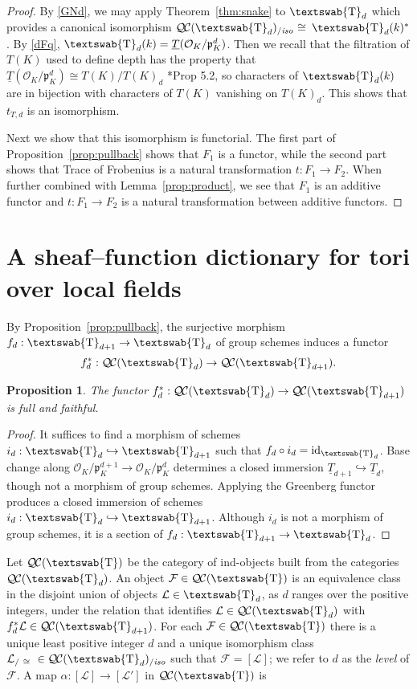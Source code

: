 \documentclass[11pt]{amsart}
\newcommand{\mathswab}[1]{\operatorname{\textswab{#1}}}
\theoremstyle{plain}
\newtheorem{proposition}[theorem]{Proposition}
\theoremstyle{definition}
\theoremstyle{remark}
\newcommand{\OK}{\mathcal{O}_K}
\newcommand{\pK}{\mathfrak{p}_K}
\newcommand{\Fq}{k}
\DeclareMathOperator{\id}{id}
\newcommand{\iso}{{\ \cong\ }}
\newcommand{\GN}[1]{\mathswab{#1}}
\newcommand{\TT}{\underline{T}}
\newcommand{\qcs}[1]{{\mathcal{#1}}}
\newcommand{\QC}{{\mathcal{Q\hskip-0.8pt C}}}
\newcommand{\QCiso}[1]{\QC(#1)_{/\textit{iso}}}
\newcommand{\trFrob}[1]{t_{#1}}
\begin{document}
\begin{proof}
  By \ref{GNd}, we may apply Theorem~\ref{thm:snake} to
  $\GN{T}_d$ which provides a canonical isomorphism
  $\QCiso{\GN{T}_d} \iso \GN{T}_d(\Fq)^*$.
  By \ref{dFq}, $\GN{T}_d(\Fq) = \TT(\OK/\pK^d)$.
  Then we recall that the filtration of $T(K)$ used to
  define depth has the property that $\TT(\OK/\pK^d) \cong T(K) / T(K)_d$
  \cite{yu:03a}*{Prop 5.2}, so characters of $\GN{T}_d(\Fq)$ 
  are in bijection with characters of $T(K)$ vanishing on $T(K)_d$. 
  This shows that $\trFrob{T,d}$ is an isomorphism.
  
  Next we show that this isomorphism is functorial.
The first part of Proposition~\ref{prop:pullback} shows that $F_1$ is a functor,
while the second part shows that Trace of Frobenius is a natural transformation
$t: F_1 \to F_2$. When further combined with Lemma~\ref{prop:product},
we see that $F_1$ is an additive functor and $t: F_1 \to F_2$ is a
natural transformation between additive functors.
\end{proof}


\section{A sheaf--function dictionary for tori over local fields} \label{sec:quasichar} 

By Proposition~\ref{prop:pullback}, the surjective morphism $f_d : \GN{T}_{d+1}\to \GN{T}_d$ of group schemes induces a functor
\[
f_d^* : \QC(\GN{T}_d) \to \QC(\GN{T}_{d+1}).
\]

\begin{proposition}
The functor $f_d^* : \QC(\GN{T}_d) \to \QC(\GN{T}_{d+1})$ is full and faithful.
\end{proposition}

\begin{proof}
It suffices to find a morphism of schemes $i_d : \GN{T}_{d}\hookrightarrow \GN{T}_{d+1}$ such that $f_d\circ i_d = \id_{\GN{T}_d}$. Base change along $\OK/\pK^{d+1} \to \OK/\pK^d$ determines a closed immersion $\TT_{d+1} \hookrightarrow \TT_d$, though not a morphism of group schemes. Applying the Greenberg functor produces a closed immersion of schemes $i_d : \GN{T}_{d} \hookrightarrow \GN{T}_{d+1}$. Although $i_d$ is not a morphism of group schemes, it is a section of $f_d : \GN{T}_{d+1}\to \GN{T}_d$.
\end{proof}

Let $\QC(\GN{T})$ be the category of ind-objects built from the categories $\QC(\GN{T}_d)$. 
An object $\qcs{F}\in \QC(\GN{T})$ is an equivalence class in the disjoint union of objects $\qcs{L}\in \GN{T}_d$, 
as $d$ ranges over the positive integers, 
under the relation that identifies $\qcs{L}\in \QC(\GN{T}_{d})$ with $f_d^*\qcs{L}\in \QC(\GN{T}_{d+1})$.
For each $\qcs{F}\in \QC(\GN{T})$ there is a unique least positive integer $d$ and a unique isomorphism class $\qcs{L}_{/\iso}\in \QCiso{\GN{T}_d}$ such that $\qcs{F} = [\qcs{L}]$; we refer to $d$ as the \emph{level} of $\qcs{F}$.
A map $\alpha : [\qcs{L}] \to [\qcs{L}']$ in $\QC(\GN{T})$ is
\end{document}
